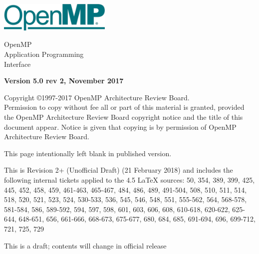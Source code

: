 
  \begin{titlepage}
    \begin{flushleft}
     \hspace{-6em} \includegraphics[width=0.4\textwidth]{openmp-logo.png}
    \end{flushleft}

    \begin{adjustwidth}{-0.75in}{0in}
    \begin{center}
      \Huge
      \textsf{OpenMP\\Application Programming\\Interface}

      \vspace{0.5in}\textsf{    }\vspace{-0.7in}
      \normalsize

      \vspace{1.0in}

      \textbf{Version 5.0 rev 2, November 2017}
    \end{center}
    \end{adjustwidth}

    \vspace{3.0in}

\begin{adjustwidth}{0pt}{1em}\setlength{\parskip}{0.25\baselineskip}%
Copyright \copyright 1997-2017 OpenMP Architecture Review Board.\\
Permission to copy without fee all or part of this material is granted,
provided the OpenMP Architecture Review Board copyright notice and
the title of this document appear. Notice is given that copying is by
permission of OpenMP Architecture Review Board.\end{adjustwidth}

  \end{titlepage}


\clearpage
\thispagestyle{empty}
\phantom{a}
This page intentionally left blank in published version.

This is Revision 2+ (Unofficial Draft) (21 February 2018) and
includes the following internal tickets applied to the 4.5 LaTeX sources:
50, 354, 389, 399, 425, 445, 452, 458, 459, 461-463, 465-467, 484, 486, 489, 
491-504, 508, 510, 511, 514, 518, 520, 521, 523, 524, 530-533, 536, 545, 
546, 548, 551, 555-562, 564, 568-578, 581-584, 586, 589-592, 594, 597, 598,
601, 603, 606, 608, 610-618, 620-622, 625-644, 648-651, 656, 661-666, 
668-673, 675-677, 680, 684, 685, 691-694, 696, 699-712, 721, 725, 729

This is a draft; contents will change in official release

\vfill

